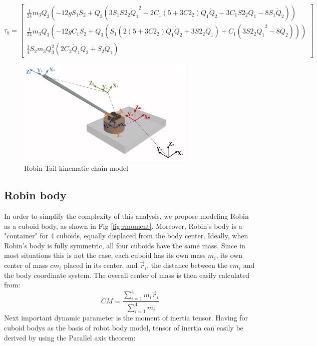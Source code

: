 \tiny
\begin{equation}
\tau_b=\begin{bmatrix}
\frac{1}{24} m_3 Q_3 \left(-12 g S_1 S_2+Q_3 \left(3 S_1 S2_2 {\dot{Q}_1}^2-2 C_1\left(5+3 C2_2\right) \dot{Q}_1 \dot{Q}_2-3 C_1 S2_2 \ddot{Q}_1-8 S_1 \ddot{Q}_2\right)\right)\\
\frac{1}{24} m_3 Q_3 \left(-12 g C_1 S_2+Q_3 \left(S_1\left( 2(5+3C2_2)\dot{Q}_1 \dot{Q}_2+3S2_2\ddot{Q}_1\right)+C_1(3S2_2{\dot{Q}_1}^2-8\ddot{Q}_2)\right)\right)\\
\frac{1}{4} S_2 m_3 Q_3^2 \left(2 C_2 \dot{Q}_1 \dot{Q}_2+S_2 \ddot{Q}_1\right)
\end{bmatrix}
\end{equation}
\normalsize

\begin{figure}
	\centering
	\includegraphics[width=85mm]{./pictures/RobinRepic.pdf}
	\caption{Robin Tail kinematic chain model}
	\label{fig:rmax}
\end{figure}

\subsection{Robin body}
In order to simplify the complexity of this analysis, we propose modeling Robin as a cuboid body, as shown in Fig \ref{fig:rmoment}. Moreover, Robin's body is a "container" for 4 cuboids, equally displaced from the body center. Ideally, when Robin's body is fully symmetric, all four cuboids have the same mass. Since in most situations this is not the case, each cuboid has its own mass $m_i$, its own center of mass $cm_i$ placed in its center, and $\vec{r}_i$, the distance between the $cm_i$ and the body coordinate system. The overall center of mass is then easily calculated from: 
\begin{equation}\label{eq:CMrobot}
CM=\frac{\sum_{i=1}^{4}m_i\vec{r}_i}{\sum_{i=1}^{4}m_i}
\end{equation}
Next important dynamic parameter is the moment of inertia tensor. Having for cuboid bodys as the basis of robot body model, tensor of inertia can easily be derived by using the Parallel axis theorem:

